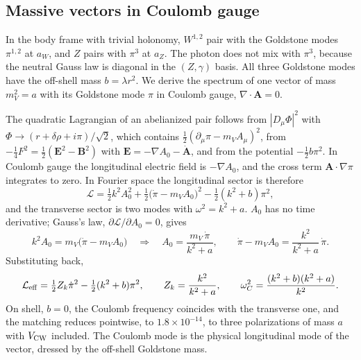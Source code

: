\subsection{Massive vectors in Coulomb gauge}
\label{sec:rb-coulomb}

In the body frame with trivial holonomy, $W^{1,2}$ pair with the Goldstone modes $\pi^{1,2}$ at $a_W$, and $Z$ pairs with $\pi^3$ at $a_Z$.
The photon does not mix with $\pi^3$, because the neutral Gauss law is diagonal in the $(Z,\gamma)$ basis.
All three Goldstone modes have the off-shell mass $b=\lambda r^2$.
We derive the spectrum of one vector of mass $m_V^2=a$ with its Goldstone mode $\pi$ in Coulomb gauge, $\nabla\cdot\bm A=0$.

The quadratic Lagrangian of an abelianized pair follows from $|D_\mu\Phi|^2$ with $\Phi\to(r+\delta\rho+i\pi)/\sqrt2$, which contains $\frac12(\partial_\mu\pi-m_VA_\mu)^2$, from $-\frac14F^2=\frac12(\bm E^2-\bm B^2)$ with $\bm E=-\nabla A_0-\dot{\bm A}$, and from the potential $-\frac12b\pi^2$.
In Coulomb gauge the longitudinal electric field is $-\nabla A_0$, and the cross term $\bm A\cdot\nabla\pi$ integrates to zero.
In Fourier space the longitudinal sector is therefore
\begin{equation}
\mathcal L=\tfrac12k^2A_0^2+\tfrac12\bigl(\dot\pi-m_VA_0\bigr)^2-\tfrac12(k^2+b)\pi^2 ,
\label{eq:rb-coulomb-L}
\end{equation}
and the transverse sector is two modes with $\omega^2=k^2+a$.
$A_0$ has no time derivative; Gauss's law, $\partial\mathcal L/\partial A_0=0$, gives
\begin{equation}
k^2A_0=m_V\bigl(\dot\pi-m_VA_0\bigr)\quad\Longrightarrow\quad A_0=\frac{m_V\,\dot\pi}{k^2+a},\qquad \dot\pi-m_VA_0=\frac{k^2}{k^2+a}\,\dot\pi .
\label{eq:rb-gauss}
\end{equation}
Substituting back,
\begin{equation}
\mathcal L_{\rm eff}=\tfrac12 Z_k\dot\pi^2-\tfrac12(k^2+b)\pi^2,\qquad Z_k=\frac{k^2}{k^2+a},\qquad
\omega_C^2=\frac{(k^2+b)(k^2+a)}{k^2}.
\label{eq:rb-coulomb}
\end{equation}
On shell, $b=0$, the Coulomb frequency coincides with the transverse one, and the matching reduces pointwise, to $1.8\times10^{-14}$, to three polarizations of mass $a$ with $V_{\rm CW}$ included. %
The Coulomb mode is the physical longitudinal mode of the vector, dressed by the off-shell Goldstone mass.

